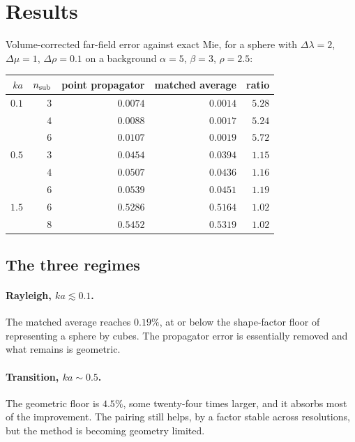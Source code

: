\documentclass[11pt,a4paper]{article}
\begin{document}
\section{Results}\label{sec:results}

Volume-corrected far-field error against exact Mie, for a sphere with
$\Delta\lambda = 2$, $\Delta\mu = 1$, $\Delta\rho = 0.1$ on a background
$\alpha=5$, $\beta=3$, $\rho=2.5$:

\begin{center}
\begin{tabular}{@{}rrrrr@{}}
\toprule
$ka$ & $n_{\rm sub}$ & point propagator & matched average & ratio\\
\midrule
$0.1$ & $3$ & $0.0074$ & $\mathbf{0.0014}$ & $5.28$\\
      & $4$ & $0.0088$ & $\mathbf{0.0017}$ & $5.24$\\
      & $6$ & $0.0107$ & $\mathbf{0.0019}$ & $5.72$\\
\midrule
$0.5$ & $3$ & $0.0454$ & $\mathbf{0.0394}$ & $1.15$\\
      & $4$ & $0.0507$ & $\mathbf{0.0436}$ & $1.16$\\
      & $6$ & $0.0539$ & $\mathbf{0.0451}$ & $1.19$\\
\midrule
$1.5$ & $6$ & $0.5286$ & $\mathbf{0.5164}$ & $1.02$\\
      & $8$ & $0.5452$ & $\mathbf{0.5319}$ & $1.02$\\
\bottomrule
\end{tabular}
\end{center}

\subsection{The three regimes}

\paragraph{Rayleigh, $ka\lesssim0.1$.}  The matched average reaches $0.19\%$,
at or below the shape-factor floor of representing a sphere by cubes.  The
propagator error is essentially removed and what remains is geometric.

\paragraph{Transition, $ka\sim0.5$.}  The geometric floor is $4.5\%$, some
twenty-four times larger, and it absorbs most of the improvement.  The pairing
still helps, by a factor stable across resolutions, but the method is becoming
geometry limited.
\end{document}
